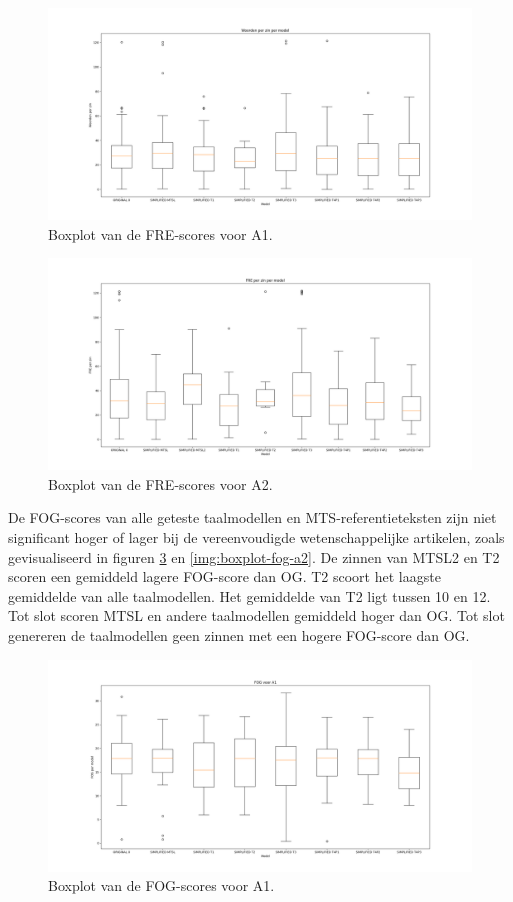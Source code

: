 \begin{figure}
	\includegraphics[width=\linewidth]{img/boxplot-fre-a1.png}
	\caption{Boxplot van de FRE-scores voor A1.}
	\label{img:boxplot-fre-a1}
\end{figure}

\begin{figure}
	\includegraphics[width=\linewidth]{img/boxplot-fre-a2.png}
	\caption{Boxplot van de FRE-scores voor A2.}
	\label{img:boxplot-fre-a2}
\end{figure}

De FOG-scores van alle geteste taalmodellen en MTS-referentieteksten zijn niet significant hoger of lager bij de vereenvoudigde wetenschappelijke artikelen, zoals gevisualiseerd in figuren \ref{img:boxplot-fog-a1} en \ref{img:boxplot-fog-a2}. De zinnen van MTSL2 en T2 scoren een gemiddeld lagere FOG-score dan OG. T2 scoort het laagste gemiddelde van alle taalmodellen. Het gemiddelde van T2 ligt tussen 10 en 12. Tot slot scoren MTSL en andere taalmodellen gemiddeld hoger dan OG. Tot slot genereren de taalmodellen geen zinnen met een hogere FOG-score dan OG.

\begin{figure}
	\includegraphics[width=\linewidth]{img/boxplot-fog-a1.png}
	\caption{Boxplot van de FOG-scores voor A1.}
	\label{img:boxplot-fog-a1}
\end{figure}

